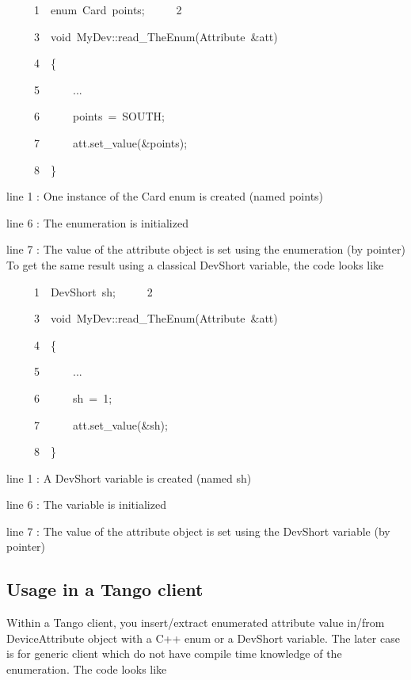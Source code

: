 \begin{lyxcode}
~~~~~1~~enum~Card~points;
~~~~~2~~

~~~~~3~~void~MyDev::read\_TheEnum(Attribute~\&att)

~~~~~4~~\{

~~~~~5~~~~~~...

~~~~~6~~~~~~points~=~SOUTH;

~~~~~7~~~~~~att.set\_value(\&points);

~~~~~8~~\}
\end{lyxcode}


line 1 : One instance of the Card enum is created (named points)

line 6 : The enumeration is initialized

line 7 : The value of the attribute object is set using the enumeration
(by pointer)\\
To get the same result using a classical DevShort variable, the code
looks like



\begin{lyxcode}
~~~~~1~~DevShort~sh;
~~~~~2~~

~~~~~3~~void~MyDev::read\_TheEnum(Attribute~\&att)

~~~~~4~~\{

~~~~~5~~~~~~...

~~~~~6~~~~~~sh~=~1;

~~~~~7~~~~~~att.set\_value(\&sh);

~~~~~8~~\}
\end{lyxcode}


line 1 : A DevShort variable is created (named sh)

line 6 : The variable is initialized

line 7 : The value of the attribute object is set using the DevShort
variable (by pointer)

\subsection{Usage in a Tango client}

Within a Tango client, you insert/extract enumerated attribute value
in/from DeviceAttribute object with a C++ enum or a DevShort variable.
The later case is for generic client which do not have compile time
knowledge of the enumeration. The code looks like



